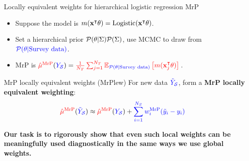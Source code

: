 
\begin{frame}[t]{Locally equivalent weights for hierarchical logistic regression MrP}
%
\vspace{-1em}
\begin{itemize}
    \item Suppose the model is $\m(\x^\trans \theta) = \mathrm{Logistic}(\x^\trans \theta)$.
    \item Set a hierarchical prior $\p(\theta \vert \Sigma)\p(\Sigma)$,
            use MCMC to draw from $\post$.
    \item MrP is $\muhatmrp = \tarcol{\meantar \expect{\post}{\m(\x_j^\trans \theta)}}$.
\end{itemize}
%
\vspace{2em}
    \begin{block}{MrP locally equivalent weights (MrPlew)}
    \centering
    \vspace{1em}
    For new data $\Ytil$, form a \textbf{MrP locally equivalent weighting}:
    $$
    \begin{aligned}
    \muhatmrp[\Ytil] \approx{}& \muhatmrp + \surcol{\sumsur \w_i^\mrp (\ytil_i - \y_i)}
    \end{aligned}
    $$
    \vspace{1em}
    \end{block}

\vspace{2em}
    \textbf{
        Our task is to rigorously show that even such local weights can be meaningfully
        used diagnostically in the same ways we use global weights.
     }

\end{frame}








